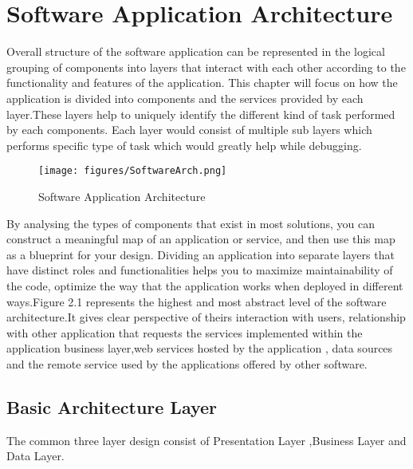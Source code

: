 \chapter{Software Application Architecture}\label{ch:ch2label}
						
						Overall structure of the software application can be represented in the logical grouping of components into layers that interact with each other according to the functionality and features of the application. This chapter will focus on how the application is divided into components and the services provided by each layer.These layers help to uniquely identify the different kind of task performed by each components. Each layer would consist of multiple sub layers which performs specific type of task which would greatly help while debugging.

\begin{figure}[!htb]
  \texttt{[image: figures/SoftwareArch.png]}
	 \caption{Software Application Architecture}
  \label{fig: Software Application Architecture}
\end{figure}						
					
						By analysing the types of components that exist in most solutions, you can construct a meaningful map of an application or service, and then use this map as a blueprint for your design. Dividing an application into separate layers that have distinct roles and functionalities helps you to maximize maintainability of the code, optimize the way that the application works when deployed in different ways.Figure 2.1 represents the highest and most abstract level of the software architecture.It gives clear perspective of theirs interaction with users, relationship with other application that requests the services implemented within the application business layer,web services hosted by the application , data sources and the remote service used by the applications offered by other software.

\section{Basic Architecture Layer}
						
						The common three layer design consist of Presentation Layer ,Business Layer and Data Layer. 
						
